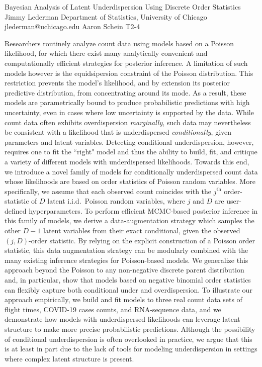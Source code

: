 \begin{talk}
  {Bayesian Analysis of Latent Underdispersion Using Discrete Order Statistics}%
  {Jimmy Lederman}%
  {Department of Statistics, University of Chicago}%
  {jlederman@uchicago.edu}%
  {Aaron Schein}%
  {T2-4}%


Researchers routinely analyze count data using models based on a Poisson likelihood, for which there exist many analytically convenient and computationally efficient strategies for posterior inference. A limitation of such models however is the equidsipersion constraint of the Poisson distribution. This restriction prevents the model's likelihood, and by extension its posterior predictive distribution, from concentrating around its mode. As a result, these models are parametrically bound to produce probabilistic predictions with high uncertainty, even in cases where low uncertainty is supported by the data. While count data often exhibits overdispersion \textit{marginally}, such data may nevertheless be consistent with a likelihood that is underdispersed \textit{conditionally}, given parameters and latent variables. Detecting conditional underdispersion, however, requires one to fit the ``right" model and thus the ability to build, fit, and critique a variety of different models with underdispersed likelihoods. Towards this end, we introduce a novel family of models for conditionally underdispersed count data whose likelihoods are based on order statistics of Poisson random variables. More specifically, we assume that each observed count coincides with the $j^{\textrm{th}}$ order-statistic of $D$ latent i.i.d.~Poisson random variables, where $j$ and $D$ are user-defined hyperparameters. To perform efficient MCMC-based posterior inference in this family of models, we derive a data-augmentation strategy which samples the other $D{-}1$ latent variables from their exact conditional, given the observed $(j,D)$-order statistic. By relying on the explicit construction of a Poisson order statistic, this data augmentation strategy can be modularly combined with the many existing inference strategies for Poisson-based models. We generalize this approach beyond the Poisson to any non-negative discrete parent distribution and, in particular, show that models based on negative binomial order statistics can flexibly capture both conditional under and overdispersion.  To illustrate our approach empirically, we build and fit models to three real count data sets of flight times, COVID-19 cases counts, and RNA-sequence data, and we demonstrate how models with underdispersed likelihoods can leverage latent structure to make more precise probabilistic predictions. Although the possibility of conditional underdispersion is often overlooked in practice, we argue that this is at least in part due to the lack of tools for modeling underdispersion in settings where complex latent structure is present.


\end{talk}
